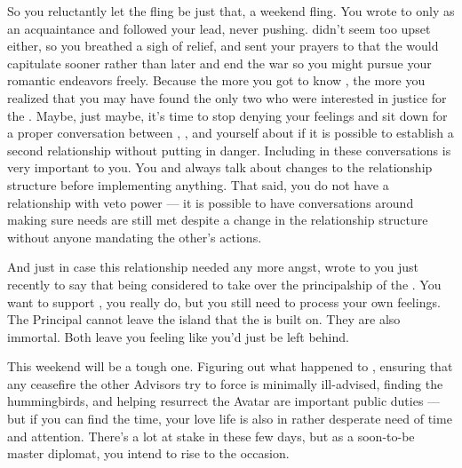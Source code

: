\documentclass[char]{GL2020}
\begin{document}
So you reluctantly let the fling be just that, a weekend fling. You wrote to \cEthics{} only as an acquaintance and \cEthics{\they} followed your lead, never pushing. \cBeetle{} didn’t seem too upset either, so you breathed a sigh of relief, and sent your prayers to \cEbb{} that the \pTech{} would capitulate sooner rather than later and end the war so you might pursue your romantic endeavors freely. Because the more you got to know \cEthics{}, the more you realized that you may have found the only two \pTechies{} who were interested in justice for the \pShip{}. Maybe, just maybe, it’s time to stop denying your feelings and sit down for a proper conversation between \cBeetle{}, \cEthics{}, and yourself about if it is possible to establish a second relationship without putting \cEthics{} in danger. Including \cBeetle{} in these conversations is very important to you. You and \cBeetle{} always talk about changes to the relationship structure before implementing anything. That said, you do not have a relationship with veto power — it is possible to have conversations around making sure needs are still met despite a change in the relationship structure without anyone mandating the other's actions. 

And just in case this relationship needed any more angst, \cBeetle{} wrote to you just recently to say that \cBeetle{\theyare} being considered to take over the principalship of the \pSc{}. You want to support \cBeetle{\them}, you really do, but you still need to process your own feelings. The Principal cannot leave the island that the \pSc{} is built on. They are also immortal. Both leave you feeling like you’d just be left behind.

This weekend will be a tough one. Figuring out what happened to \cHeadDiplomat{}, ensuring that any ceasefire the other Advisors try to force is minimally ill-advised, finding the hummingbirds, and helping resurrect the \cEbb{} Avatar are important public duties — but if you can find the time, your love life is also in rather desperate need of time and attention. There's a lot at stake in these few days, but as a soon-to-be master diplomat, you intend to rise to the occasion.
\end{document}
